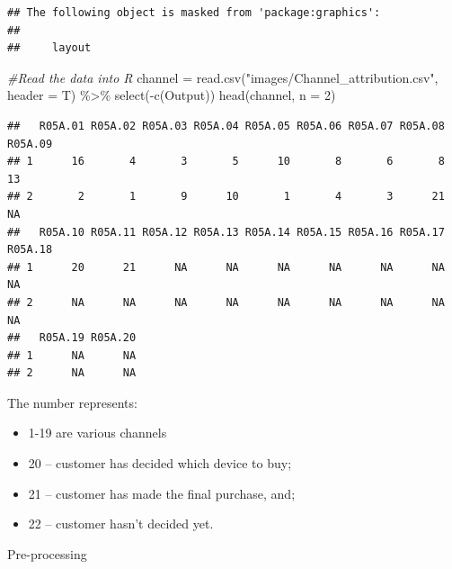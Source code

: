 \documentclass[
]{book}
\newenvironment{Shaded}{\begin{snugshade}}{\end{snugshade}}
\newcommand{\AttributeTok}[1]{\textcolor[rgb]{0.77,0.63,0.00}{#1}}
\newcommand{\CommentTok}[1]{\textcolor[rgb]{0.56,0.35,0.01}{\textit{#1}}}
\newcommand{\ControlFlowTok}[1]{\textcolor[rgb]{0.13,0.29,0.53}{\textbf{#1}}}
\newcommand{\DecValTok}[1]{\textcolor[rgb]{0.00,0.00,0.81}{#1}}
\newcommand{\FunctionTok}[1]{\textcolor[rgb]{0.00,0.00,0.00}{#1}}
\newcommand{\NormalTok}[1]{#1}
\newcommand{\OtherTok}[1]{\textcolor[rgb]{0.56,0.35,0.01}{#1}}
\newcommand{\SpecialCharTok}[1]{\textcolor[rgb]{0.00,0.00,0.00}{#1}}
\newcommand{\StringTok}[1]{\textcolor[rgb]{0.31,0.60,0.02}{#1}}
\providecommand{\tightlist}{%
  \setlength{\itemsep}{0pt}\setlength{\parskip}{0pt}}
\begin{document}
\begin{verbatim}
## The following object is masked from 'package:graphics':
## 
##     layout
\end{verbatim}

\begin{Shaded}
\begin{Highlighting}[]
\CommentTok{\#Read the data into R}
\NormalTok{channel }\OtherTok{=} \FunctionTok{read.csv}\NormalTok{(}\StringTok{"images/Channel\_attribution.csv"}\NormalTok{, }\AttributeTok{header =}\NormalTok{ T) }\SpecialCharTok{\%\textgreater{}\%} \FunctionTok{select}\NormalTok{(}\SpecialCharTok{{-}}\FunctionTok{c}\NormalTok{(Output))}
\FunctionTok{head}\NormalTok{(channel, }\AttributeTok{n =} \DecValTok{2}\NormalTok{)}
\end{Highlighting}
\end{Shaded}

\begin{verbatim}
##   R05A.01 R05A.02 R05A.03 R05A.04 R05A.05 R05A.06 R05A.07 R05A.08 R05A.09
## 1      16       4       3       5      10       8       6       8      13
## 2       2       1       9      10       1       4       3      21      NA
##   R05A.10 R05A.11 R05A.12 R05A.13 R05A.14 R05A.15 R05A.16 R05A.17 R05A.18
## 1      20      21      NA      NA      NA      NA      NA      NA      NA
## 2      NA      NA      NA      NA      NA      NA      NA      NA      NA
##   R05A.19 R05A.20
## 1      NA      NA
## 2      NA      NA
\end{verbatim}

The number represents:

\begin{itemize}
\tightlist
\item
  1-19 are various channels
\item
  20 -- customer has decided which device to buy;
\item
  21 -- customer has made the final purchase, and;
\item
  22 -- customer hasn't decided yet.
\end{itemize}

Pre-processing

\begin{Shaded}
\end{Shaded}
\end{document}
